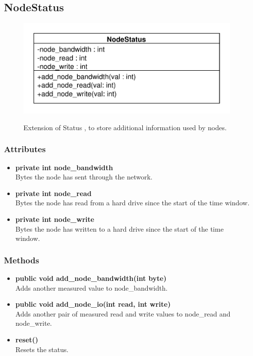 \subsection{NodeStatus}
\begin{figure}[htbp]
	\begin{minipage}[t]{7cm}
		\vspace{0pt}
		\centering
		\includegraphics[scale=0.6]{./diagram_pictures/NodeInterface/NodeStatus.pdf}
	\end{minipage}
	\hfill
	\begin{minipage}[t]{7cm}
		\vspace{10pt}
		Extension of Status , to store additional information used by nodes.
	\end{minipage}
\end{figure}


\subsubsection{Attributes}
\begin{itemize}
	\item \textbf{private int node\_bandwidth}\\
	Bytes the node has sent through the network.
	\item \textbf{private int node\_read}\\
	Bytes the node has read from a hard drive since the start of the time window.
	\item \textbf{private int node\_write}\\
	Bytes the node has written to a hard drive since the start of the time window.
\end{itemize}

\subsubsection{Methods}
\begin{itemize}
	\item \textbf{public void add\_node\_bandwidth(int byte)}\\
	Adds another measured value  to node\_bandwidth.
	\item \textbf{public void add\_node\_io(int read, int write)}\\
	Adds another pair of measured read and write values to node\_read and node\_write.
	\item \textbf{reset()}\\
	Resets the status.
\end{itemize}

